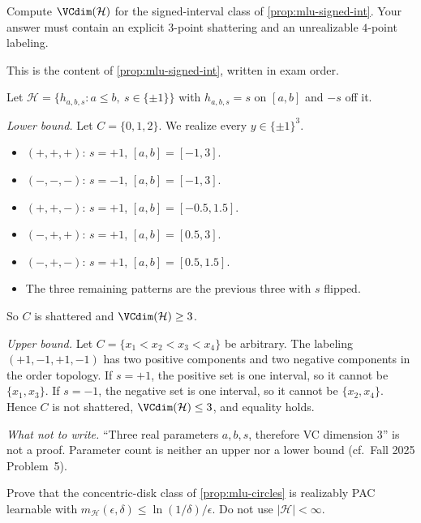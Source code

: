 \begin{exercise}
\label{ex:mlu-signed}
Compute $\VCdim(\mathcal{H})$ for the signed-interval class of \cref{prop:mlu-signed-int}. Your answer must contain an explicit $3$-point shattering and an unrealizable $4$-point labeling.
\end{exercise}

\begin{solution}
This is the content of \cref{prop:mlu-signed-int}, written in exam order.

Let $\mathcal{H}=\{h_{a,b,s}:a\le b,\ s\in\{\pm1\}\}$ with $h_{a,b,s}=s$ on $[a,b]$ and $-s$ off it.

\textit{Lower bound.}
Let $C=\{0,1,2\}$. We realize every $y\in\{\pm1\}^3$.
\begin{itemize}
    \item $(+,+,+)$: $s=+1$, $[a,b]=[-1,3]$.
    \item $(-,-,-)$: $s=-1$, $[a,b]=[-1,3]$.
    \item $(+,+,-)$: $s=+1$, $[a,b]=[-0.5,1.5]$.
    \item $(-,+,+)$: $s=+1$, $[a,b]=[0.5,3]$.
    \item $(-,+,-)$: $s=+1$, $[a,b]=[0.5,1.5]$.
    \item The three remaining patterns are the previous three with $s$ flipped.
\end{itemize}
So $C$ is shattered and $\VCdim(\mathcal{H})\ge 3$.

\textit{Upper bound.}
Let $C=\{x_1<x_2<x_3<x_4\}$ be arbitrary. The labeling $(+1,-1,+1,-1)$ has two positive components and two negative components in the order topology. If $s=+1$, the positive set is one interval, so it cannot be $\{x_1,x_3\}$. If $s=-1$, the negative set is one interval, so it cannot be $\{x_2,x_4\}$. Hence $C$ is not shattered, $\VCdim(\mathcal{H})\le 3$, and equality holds.

\textit{What not to write.}
``Three real parameters $a,b,s$, therefore VC dimension $3$'' is not a proof. Parameter count is neither an upper nor a lower bound (cf.\ Fall 2025 Problem~5).
\end{solution}

\begin{exercise}
\label{ex:mlu-circles}
Prove that the concentric-disk class of \cref{prop:mlu-circles} is realizably PAC learnable with $m_{\mathcal{H}}(\epsilon,\delta)\le\ln(1/\delta)/\epsilon$. Do not use $\lvert\mathcal{H}\rvert<\infty$.
\end{exercise}

